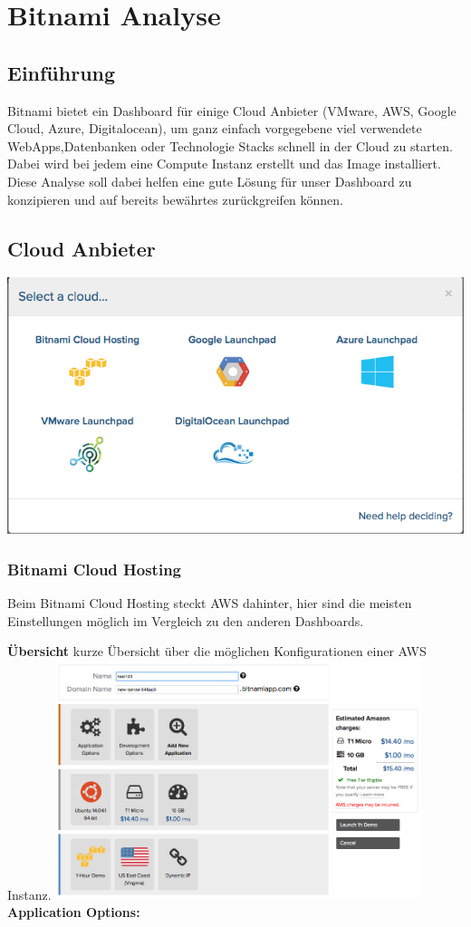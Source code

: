
\section{Bitnami Analyse}
\subsection{Einführung}
 
Bitnami bietet ein Dashboard für einige Cloud Anbieter (VMware, AWS, Google Cloud, Azure, 
Digitalocean), um ganz einfach vorgegebene viel verwendete WebApps,Datenbanken oder Technologie Stacks 
schnell in der Cloud zu starten.
Dabei wird bei jedem eine Compute Instanz erstellt und das Image installiert.
Diese Analyse soll dabei helfen eine gute Lösung für unser Dashboard zu 
konzipieren und auf bereits bewährtes zurückgreifen können.

\subsection{Cloud Anbieter}
\includegraphics[width=\textwidth]{./03_Analyse/03_Bitnami/images/clouds}
\subsubsection{Bitnami Cloud Hosting}
Beim Bitnami Cloud Hosting steckt AWS dahinter, hier sind die meisten 
Einstellungen möglich im Vergleich zu den anderen Dashboards.


\textbf{Übersicht}
kurze Übersicht über die möglichen Konfigurationen einer AWS Instanz.
\includegraphics[width=0.8\textwidth]{./03_Analyse/03_Bitnami/images/aws_overview}
\newpage
\textbf{Application Options:}


